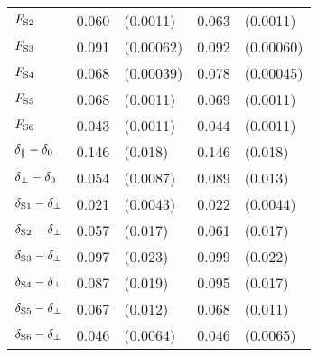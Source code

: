 \begin{table}[htbp]
\begin{tabular}{lllll}
    $\FS[2]$             &  0.060  &  (0.0011)                               &  0.063  &  (0.0011)                             \\
    $\FS[3]$             &  0.091  &  (0.00062)                              &  0.092  &  (0.00060)                            \\
    $\FS[4]$             &  0.068  &  (0.00039)                              &  0.078  &  (0.00045)                            \\
    $\FS[5]$             &  0.068  &  (0.0011)                               &  0.069  &  (0.0011)                             \\
    $\FS[6]$             &  0.043  &  (0.0011)                               &  0.044  &  (0.0011)                             \\
    \hline
    $\delpar-\delzero$   &  0.146  &  (0.018)                                &  0.146  &  (0.018)                              \\
    $\delperp-\delzero$  &  0.054  &  (0.0087)                               &  0.089  &  (0.013)                              \\
    $\delS[1]-\delperp$  &  0.021  &  (0.0043)                               &  0.022  &  (0.0044)                             \\
    $\delS[2]-\delperp$  &  0.057  &  (0.017)                                &  0.061  &  (0.017)                              \\
    $\delS[3]-\delperp$  &  0.097  &  (0.023)                                &  0.099  &  (0.022)                              \\
    $\delS[4]-\delperp$  &  0.087  &  (0.019)                                &  0.095  &  (0.017)                              \\
    $\delS[5]-\delperp$  &  0.067  &  (0.012)                                &  0.068  &  (0.011)                              \\
    $\delS[6]-\delperp$  &  0.046  &  (0.0064)                               &  0.046  &  (0.0065)                             \\
    \hline
  \end{tabular}
\end{table}

